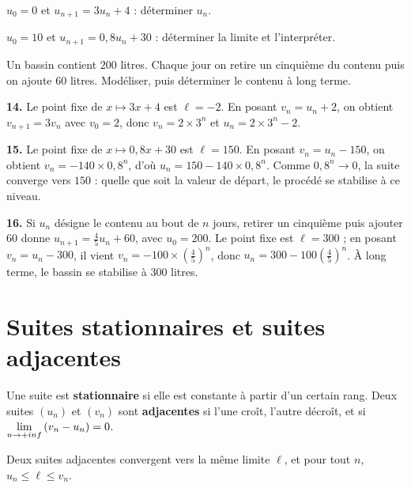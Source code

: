 \begin{entrainement}
\exo[\niveau{1}] $u_{0} = 0$ et $u_{n+1} = 3u_{n}+4$ : déterminer $u_{n}$.

\exo[\niveau{2}] $u_{0} = 10$ et $u_{n+1} = 0{,}8u_{n}+30$ : déterminer la
limite et l'interpréter.

\exo[\niveau{3}] Un bassin contient $200$ litres. Chaque jour on retire un
cinquième du contenu puis on ajoute $60$ litres. Modéliser, puis déterminer
le contenu à long terme.
\end{entrainement}

\begin{corrige}
\textbf{14.} Le point fixe de $x \mapsto 3x+4$ est $\ell = -2$. En posant
$v_{n} = u_{n}+2$, on obtient $v_{n+1} = 3v_{n}$ avec $v_{0} = 2$, donc
$v_{n} = 2\times3^{n}$ et $u_{n} = 2\times3^{n}-2$.

\textbf{15.} Le point fixe de $x \mapsto 0{,}8x+30$ est $\ell = 150$. En
posant $v_{n} = u_{n}-150$, on obtient $v_{n} = -140\times0{,}8^{n}$, d'où
$u_{n} = 150-140\times0{,}8^{n}$. Comme $0{,}8^{n}\to0$, la suite converge
vers $150$ : quelle que soit la valeur de départ, le procédé se stabilise à
ce niveau.

\textbf{16.} Si $u_{n}$ désigne le contenu au bout de $n$ jours, retirer un
cinquième puis ajouter $60$ donne $u_{n+1} = \frac45u_{n}+60$, avec
$u_{0} = 200$. Le point fixe est $\ell = 300$ ; en posant
$v_{n} = u_{n}-300$, il vient $v_{n} = -100\times\left(\frac45\right)^{n}$,
donc $u_{n} = 300-100\left(\frac45\right)^{n}$. À long terme, le bassin se
stabilise à $300$ litres.
\end{corrige}

\section{Suites stationnaires et suites adjacentes}

\begin{definition}
Une suite est \textbf{stationnaire} si elle est constante à partir d'un
certain rang. Deux suites $(u_{n})$ et $(v_{n})$ sont \textbf{adjacentes} si
l'une croît, l'autre décroît, et si $\limn\left(v_{n}-u_{n}\right) = 0$.
\end{definition}

\begin{theoreme}
Deux suites adjacentes convergent vers la même limite $\ell$, et pour tout
$n$, $u_{n} \leq \ell \leq v_{n}$.
\end{theoreme}

